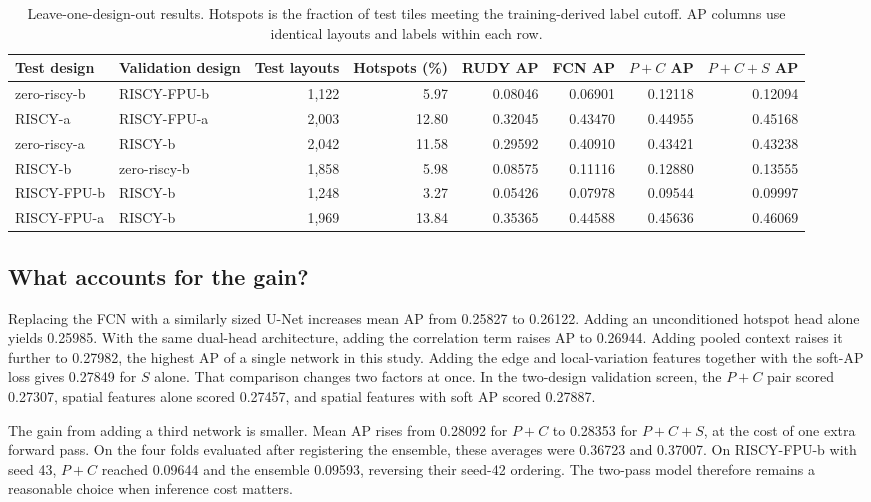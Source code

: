 \IfFileExists{./ieeeconf.cls}{\documentclass[9pt]{ieeeconf}}{\documentclass[conference]{IEEEtran}\usepackage[T1]{fontenc}}
\begin{document}
\begin{table}[t]
\centering
\caption{Leave-one-design-out results. Hotspots is the fraction of test tiles meeting the training-derived label cutoff. AP columns use identical layouts and labels within each row.}
\label{tab:design}
\begin{tabular}{llrrrrrr}
\toprule
Test design & Validation design & Test layouts & Hotspots (\%) & RUDY AP & FCN AP & $P+C$ AP & $P+C+S$ AP \\
\midrule
zero-riscy-b & RISCY-FPU-b & 1,122 & 5.97 & 0.08046 & 0.06901 & 0.12118 & 0.12094 \\
RISCY-a & RISCY-FPU-a & 2,003 & 12.80 & 0.32045 & 0.43470 & 0.44955 & 0.45168 \\
zero-riscy-a & RISCY-b & 2,042 & 11.58 & 0.29592 & 0.40910 & 0.43421 & 0.43238 \\
RISCY-b & zero-riscy-b & 1,858 & 5.98 & 0.08575 & 0.11116 & 0.12880 & 0.13555 \\
RISCY-FPU-b & RISCY-b & 1,248 & 3.27 & 0.05426 & 0.07978 & 0.09544 & 0.09997 \\
RISCY-FPU-a & RISCY-b & 1,969 & 13.84 & 0.35365 & 0.44588 & 0.45636 & 0.46069 \\
\bottomrule
\end{tabular}
\end{table}

\subsection{What accounts for the gain?}
Replacing the FCN with a similarly sized U-Net increases mean AP from 0.25827 to 0.26122. Adding an unconditioned hotspot head alone yields 0.25985. With the same dual-head architecture, adding the correlation term raises AP to 0.26944. Adding pooled context raises it further to 0.27982, the highest AP of a single network in this study. Adding the edge and local-variation features together with the soft-AP loss gives 0.27849 for $S$ alone. That comparison changes two factors at once. In the two-design validation screen, the $P+C$ pair scored 0.27307, spatial features alone scored 0.27457, and spatial features with soft AP scored 0.27887.

The gain from adding a third network is smaller. Mean AP rises from 0.28092 for $P+C$ to 0.28353 for $P+C+S$, at the cost of one extra forward pass. On the four folds evaluated after registering the ensemble, these averages were 0.36723 and 0.37007. On RISCY-FPU-b with seed 43, $P+C$ reached 0.09644 and the ensemble 0.09593, reversing their seed-42 ordering. The two-pass model therefore remains a reasonable choice when inference cost matters.
\end{document}
